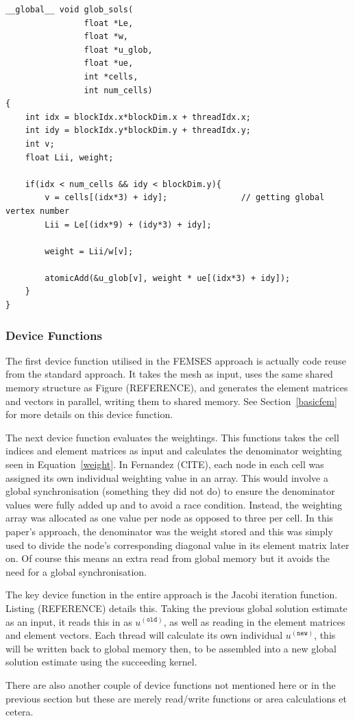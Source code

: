 \begin{lstlisting}[style=cppStyle, caption={Kernel to assemble global solution vector in FEMSES from local solution estimates using weighting.}, label={lst:global}]
__global__ void glob_sols(
                float *Le, 
                float *w, 
                float *u_glob, 
                float *ue, 
                int *cells,
                int num_cells)
{
    int idx = blockIdx.x*blockDim.x + threadIdx.x;
    int idy = blockIdx.y*blockDim.y + threadIdx.y;
    int v;
    float Lii, weight;

    if(idx < num_cells && idy < blockDim.y){
        v = cells[(idx*3) + idy];               // getting global vertex number
        Lii = Le[(idx*9) + (idy*3) + idy];      
        
        weight = Lii/w[v];
        
        atomicAdd(&u_glob[v], weight * ue[(idx*3) + idy]);
    }
}
\end{lstlisting}
\subsubsection{Device Functions}

The first device function utilised in the FEMSES approach is actually code reuse from the standard approach. It takes the mesh as input, uses the same shared memory structure as Figure (REFERENCE), and generates the element matrices and vectors in parallel, writing them to shared memory. See Section~\ref{basicfem} for more details on this device function.

The next device function evaluates the weightings. This functions takes the cell indices and element matrices as input and calculates the denominator weighting seen in Equation~\eqref{weight}. In Fernandez (CITE), each node in each cell was assigned its own individual weighting value in an array. This would involve a global synchronisation (something they did not do) to ensure the denominator values were fully added up and to avoid a race condition. Instead, the weighting array was allocated as one value per node as opposed to three per cell. In this paper's approach, the denominator was the weight stored and this was simply used to divide the node's corresponding diagonal value in its element matrix later on. Of course this means an extra read from global memory but it avoids the need for a global synchronisation.

The key device function in the entire approach is the Jacobi iteration function. Listing (REFERENCE) details this. Taking the previous global solution estimate as an input, it reads this in as $u^{(\texttt{old})}$, as well as reading in the element matrices and element vectors. Each thread will calculate its own individual $u^{(\texttt{new})}$, this will be written back to global memory then, to be assembled into a new global solution estimate using the succeeding kernel.

There are also another couple of device functions not mentioned here or in the previous section but these are merely read/write functions or area calculations et cetera.